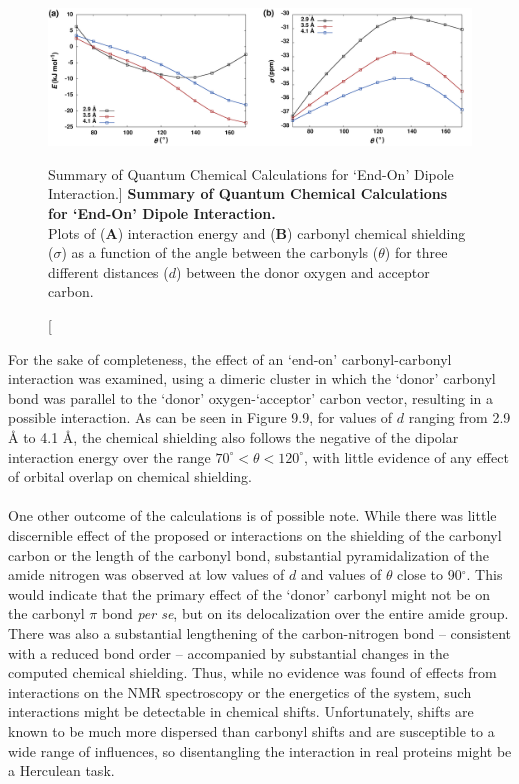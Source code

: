 \begin{figure}[h!]
\includegraphics[width=6.5in]{figs/npistar/09-curves.png}
\caption
   [Summary of Quantum Chemical Calculations for `End-On' Dipole Interaction.]
  {{\bf
    Summary of Quantum Chemical Calculations for `End-On' Dipole Interaction.
  }
  \\
  Plots of ({\bf A}) interaction energy and ({\bf B}) carbonyl \cnmr{} chemical
  shielding ($\sigma$) as a function of the angle between the carbonyls
  ($\theta$) for three different distances ($d$) between the donor oxygen
  and acceptor carbon.
}
\end{figure}

\begin{doublespace}
For the sake of completeness, the effect of an `end-on' carbonyl-carbonyl
interaction was examined, using a dimeric cluster in which the `donor' carbonyl
bond was parallel to the `donor' oxygen-`acceptor' carbon vector, resulting in
a possible \nspistar{} interaction. As can be seen in Figure 9.9, for values of
$d$ ranging from 2.9 \r{A} to 4.1 \r{A}, the chemical shielding also follows
the negative of the dipolar interaction energy over the range
$70^\circ < \theta < 120^\circ$, with little evidence of any effect of orbital
overlap on chemical shielding.
\\\\
One other outcome of the calculations is of possible note. While there was
little discernible effect of the proposed \nspistar{} or \npipistar{}
interactions on the shielding of the carbonyl carbon or the length of the
carbonyl bond, substantial pyramidalization of the amide nitrogen was observed
at low values of $d$ and values of $\theta$ close to 90$^\circ$. This would
indicate that the primary effect of the `donor' carbonyl might not be on the
carbonyl $\pi$ bond \emph{per se}, but on its delocalization over the entire
amide group. There was also a substantial lengthening of the carbon-nitrogen
bond -- consistent with a reduced bond order -- accompanied by substantial
changes in the computed \nnmr{} chemical shielding. Thus, while no evidence
was found of effects from \nspistar{} interactions on the \cnmr{} NMR
spectroscopy or the energetics of the system, such interactions might be
detectable in \nnmr{} chemical shifts. Unfortunately, \nnmr{} shifts are known
to be much more dispersed than carbonyl \cnmr{} shifts and are susceptible to
a wide range of influences, so disentangling the interaction in real proteins
might be a Herculean task.
\end{doublespace}

